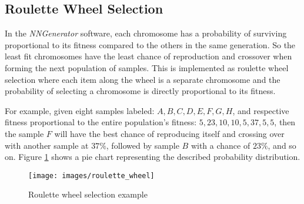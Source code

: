 \subsection{Roulette Wheel Selection}
In the {\it NNGenerator} software, each chromosome has a probability of surviving proportional to its fitness compared to the others in the same generation. 
So the least fit chromosomes have the least chance of reproduction and crossover when forming the next population of samples. 
This is implemented as roulette wheel selection where each item along the wheel is a separate chromosome and the probability of selecting a chromosome is directly proportional to its fitness.

For example, given eight samples labeled: $A, B, C, D, E, F, G, H$, and respective fitness proportional to the entire population's fitness: 
$5, 23, 10, 10, 5, 37, 5, 5$, then the sample $F$ will have the best chance of reproducing itself and crossing over with another sample at $37\%$, followed by sample $B$ with a chance of $23\%$, and so on.
Figure \ref{roulette_wheel} shows a pie chart representing the described probability distribution.

\begin{figure}[h!]
  \centering
  \texttt{[image: images/roulette\_wheel]}
  \caption{Roulette wheel selection example}
  \label{roulette_wheel}
\end{figure}

